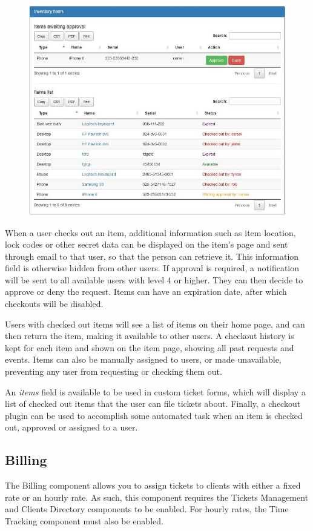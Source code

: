 \documentclass[11pt]{article}
\begin{document}
\begin{figure}[h]
\includegraphics{items.jpg}
\end{figure}

When a user checks out an item, additional information such as item location, lock codes or other secret data can be displayed on the item's page and sent through email to that user, so that the person can retrieve it. This information field is otherwise hidden from other users. If approval is required, a notification will be sent to all available users with level 4 or higher. They can then decide to approve or deny the request. Items can have an expiration date, after which checkouts will be disabled.

Users with checked out items will see a list of items on their home page, and can then return the item, making it available to other users. A checkout history is kept for each item and shown on the item page, showing all past requests and events. Items can also be manually assigned to users, or made unavailable, preventing any user from requesting or checking them out.

An \textit{items} field is available to be used in custom ticket forms, which will display a list of checked out items that the user can file tickets about. Finally, a checkout plugin can be used to accomplish some automated task when an item is checked out, approved or assigned to a user.

\subsection{Billing}
The Billing component allows you to assign tickets to clients with either a fixed rate or an hourly rate. As such, this component requires the Tickets Management and Clients Directory components to be enabled. For hourly rates, the Time Tracking component must also be enabled.
\end{document}

